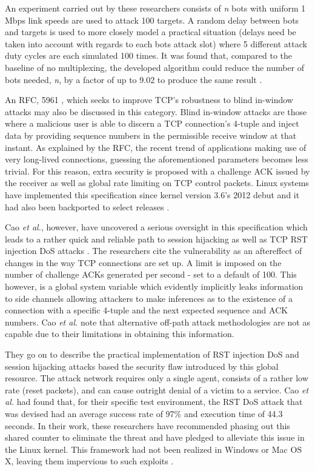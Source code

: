 \documentclass[conference]{IEEEtran}
\begin{document}
An experiment carried out by these researchers consists of \textit{n} bots with uniform 1 Mbps link speeds are used to attack 100 targets. A random delay between bots and targets is used to more closely model a practical situation (delays need be taken into account with regards to each bots attack slot) where 5 different attack duty cycles are each simulated 100 times. It was found that, compared to the baseline of no multiplexing, the developed algorithm could reduce the number of bots needed, \textit{n}, by a factor of up to 9.02 to produce the same result \cite{Li:LAAEM}.

An RFC, 5961 \cite{Dalal:blindInWindow}, which seeks to improve TCP's robustness to blind in-window attacks may also be discussed in this category. Blind in-window attacks are those where a malicious user is able to discern a TCP connection's 4-tuple and inject data by providing sequence numbers in the permissible receive window at that instant. As explained by the RFC, the recent trend of applications making use of very long-lived connections, guessing the aforementioned parameters becomes less trivial. For this reason, extra security is proposed with a challenge ACK issued by the receiver as well as global rate limiting on TCP control packets. Linux systems have implemented this specification since kernel version 3.6's 2012 debut and it had also been backported to select releases \cite{OffPath:Cao}.

Cao \textit{et al.}, however, have uncovered a serious oversight in this specification which leads to a rather quick and reliable path to session hijacking as well as TCP RST injection DoS attacks \cite{OffPath:Cao}. The researchers cite the vulnerability as an aftereffect of changes in the way TCP connections are set up. A limit is imposed on the number of challenge ACKs generated per second - set to a default of 100. This however, is a global system variable which evidently implicitly leaks information to side channels allowing attackers to make inferences as to the existence of a connection with a specific 4-tuple and the next expected sequence and ACK numbers. Cao \textit{et al.} note that alternative off-path attack methodologies are not as capable due to their limitations in obtaining this information.

They go on to describe the practical implementation of RST injection DoS and session hijacking attacks based the security flaw introduced by this global resource. The attack network requires only a single agent, consists of a rather low rate (reset packets), and can cause outright denial of a victim to a service. Cao \textit{et al.} had found that, for their specific test environment, the RST DoS attack that was devised had an average success rate of 97\% and execution time of 44.3 seconds. In their work, these researchers have recommended phasing out this shared counter to eliminate the threat and have pledged to alleviate this issue in the Linux kernel. This framework had not been realized in Windows or Mac OS X, leaving them impervious to such exploits \cite{OffPath:Cao}.
\end{document}
